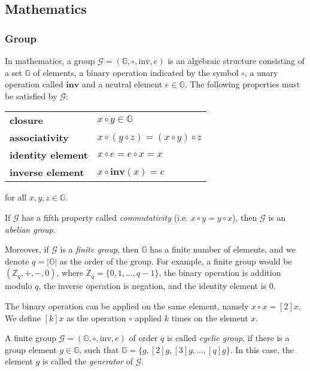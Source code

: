 \subsection{Mathematics} \label{app: mathematics}


\subsubsection{Group}
In mathematics, a group $\mathcal{G} = (\mathbb{G}, \circ, \mathrm{inv}, e)$ is an algebraic structure consisting of a set $\mathbb{G}$ of elements, a binary operation indicated by the symbol $\circ$, a unary operation called $\mathbf{inv}$ and a neutral element $e \in \mathbb{G}$. The following properties must be satisfied by $\mathcal{G}$:

\begin{center}
\begin{tabular}{ l l }
 \textbf{closure} & $x \circ y \in \mathbb{G}$ \\ 
 \textbf{associativity} & $x \circ (y \circ z) = (x \circ y) \circ z$ \\  
 \textbf{identity element} & $x \circ e = e \circ x = x$ \\
 \textbf{inverse element} & $x \circ \mathbf{inv}(x) = e$
\end{tabular}
\end{center}
for all $x, y, z \in \mathbb{G}$.

If $\mathcal{G}$ has a fifth property called \textit{commutativity} (i.e. $x \circ y = y \circ x$), then $\mathcal{G}$ is an \textit{abelian group}. 

Moreover, if $\mathcal{G}$ is a \textit{finite group}, then $\mathbb{G}$ has a finite number of elements, and we denote $q = |\mathbb{G}|$ as the order of the group. For example, a finite group would be $(\mathbb{Z}_q, +, -, 0)$, where $\mathbb{Z}_q  = \{ 0, 1, ..., q-1 \}$, the binary operation is addition modulo $q$, the inverse operation is negation, and the identity element is 0.

The binary operation can be applied on the same element, namely $x \circ x = [2]x$. We define $[k]x$ as the operation $\circ$ applied $k$ times on the element $x$. 

A finite group $\mathcal{G} = (\mathbb{G}, \circ, \mathrm{inv}, e)$ of order $q$ is called \textit{cyclic group}, if there is a group element $g \in \mathbb{G}$, such that $\mathbb{G} = \{ g, [2]g, [3]g, ..., [q]g \}$. In this case, the element $g$ is called the \textit{generator} of $\mathcal{G}$.



